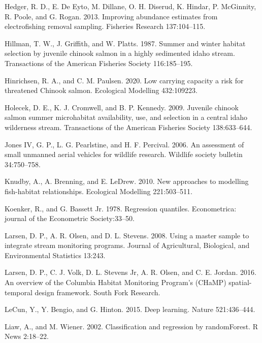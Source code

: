 \documentclass[
  12pt,
]{article}
\begin{document}
\leavevmode\hypertarget{ref-Hedger2013}{}%
Hedger, R. D., E. De Eyto, M. Dillane, O. H. Diserud, K. Hindar, P. McGinnity, R. Poole, and G. Rogan. 2013. Improving abundance estimates from electrofishing removal sampling. Fisheries Research 137:104--115.

\leavevmode\hypertarget{ref-Hillman1987}{}%
Hillman, T. W., J. Griffith, and W. Platts. 1987. Summer and winter habitat selection by juvenile chinook salmon in a highly sedimented idaho stream. Transactions of the American Fisheries Society 116:185--195.

\leavevmode\hypertarget{ref-Hinrichsen2020}{}%
Hinrichsen, R. A., and C. M. Paulsen. 2020. Low carrying capacity a risk for threatened Chinook salmon. Ecological Modelling 432:109223.

\leavevmode\hypertarget{ref-Holecek2009}{}%
Holecek, D. E., K. J. Cromwell, and B. P. Kennedy. 2009. Juvenile chinook salmon summer microhabitat availability, use, and selection in a central idaho wilderness stream. Transactions of the American Fisheries Society 138:633--644.

\leavevmode\hypertarget{ref-Jones2006}{}%
Jones IV, G. P., L. G. Pearlstine, and H. F. Percival. 2006. An assessment of small unmanned aerial vehicles for wildlife research. Wildlife society bulletin 34:750--758.

\leavevmode\hypertarget{ref-Knudby2010}{}%
Knudby, A., A. Brenning, and E. LeDrew. 2010. New approaches to modelling fish-habitat relationships. Ecological Modelling 221:503--511.

\leavevmode\hypertarget{ref-Koenker1978}{}%
Koenker, R., and G. Bassett Jr. 1978. Regression quantiles. Econometrica: journal of the Econometric Society:33--50.

\leavevmode\hypertarget{ref-Larsen2008}{}%
Larsen, D. P., A. R. Olsen, and D. L. Stevens. 2008. Using a master sample to integrate stream monitoring programs. Journal of Agricultural, Biological, and Environmental Statistics 13:243.

\leavevmode\hypertarget{ref-Larsen2016}{}%
Larsen, D. P., C. J. Volk, D. L. Stevens Jr, A. R. Olsen, and C. E. Jordan. 2016. An overview of the Columbia Habitat Monitoring Program's (CHaMP) spatial-temporal design framework. South Fork Research.

\leavevmode\hypertarget{ref-LeCun2015}{}%
LeCun, Y., Y. Bengio, and G. Hinton. 2015. Deep learning. Nature 521:436--444.

\leavevmode\hypertarget{ref-randomForest2002}{}%
Liaw, A., and M. Wiener. 2002. Classification and regression by randomForest. R News 2:18--22.
\end{document}
